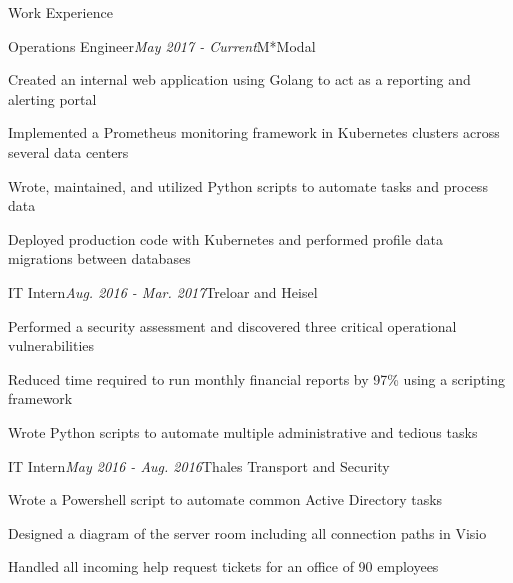 \documentclass{resume} %
\begin{document}
\begin{rSection}{\vspace{-5pt}Work Experience}

\begin{rSubsection}{Operations Engineer}{\em May 2017 - Current}{M*Modal}{}
\item {Created an internal web application using Golang to act as a reporting and alerting portal}
\item {Implemented a Prometheus monitoring framework in Kubernetes clusters across several data centers}
\item {Wrote, maintained, and utilized Python scripts to automate tasks and process data}
\item {Deployed production code with Kubernetes and performed profile data migrations between databases}
\end{rSubsection}



\begin{rSubsection}{\vspace{-5pt}IT Intern}{\em Aug. 2016 - Mar. 2017}{Treloar and Heisel}{}
\item {Performed a security assessment and discovered three critical operational vulnerabilities}
\item {Reduced time required to run monthly financial reports by 97\% using a scripting framework}
\item {Wrote Python scripts to automate multiple administrative and tedious tasks}
\end{rSubsection}


\begin{rSubsection}{\vspace{-5pt}IT Intern}{\em May 2016 - Aug. 2016}{Thales Transport and Security}{}
\item {Wrote a Powershell script to automate common Active Directory tasks}
\item {Designed a diagram of the server room including all connection paths in Visio}
\item {Handled all incoming help request tickets for an office of 90 employees}
\end{rSubsection}

\end{rSection}
\end{document}
